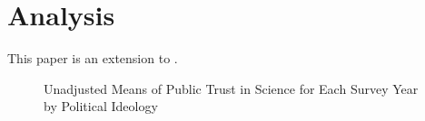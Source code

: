 \documentclass[12pt, a4paper]{article}
\let\stdsection\section
\renewcommand\section{\newpage\stdsection}
\begin{document}
\section*{Analysis}

This paper is an extension to \cite{gauchat_politicization_2012}.



\begin{figure}[h]
	\caption{Unadjusted Means of Public Trust in Science for Each Survey Year by Political Ideology}
	
\end{figure}

\clearpage

\printbibliography
\end{document}

